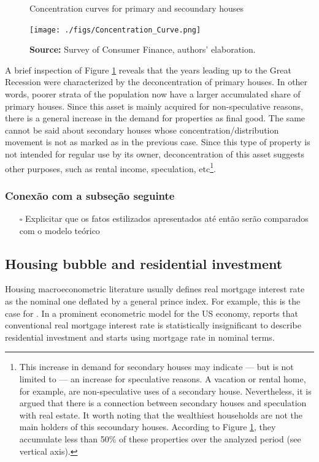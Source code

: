 \documentclass[11pt]{article}
\begin{document}
\begin{figure}[htb]
    \centering
        \caption{Concentration curves for primary and secoundary houses} 
    \texttt{[image: ./figs/Concentration\_Curve.png]}
    \label{fig:concentration}
    \caption*{\textbf{Source:} Survey of Consumer Finance, authors’ elaboration.}
\end{figure}


A brief inspection of Figure \ref{fig:concentration} reveals that the years leading up to the Great Recession were characterized by the deconcentration of primary houses. In other words, poorer strata of the population now have a larger accumulated share of primary houses. 
Since this asset is mainly acquired for non-speculative reasons, there is a general increase in the demand for properties as final good. The same cannot be said about secondary houses whose concentration/distribution movement is not as marked as in the previous case. Since this type of property is not intended for regular use by its owner, deconcentration of this asset suggests other purposes, such as rental income, speculation, etc\footnote{This increase in demand for secondary houses may indicate --- but is not limited to --- an increase for speculative reasons. A vacation or rental home, for example, are non-speculative uses of a secondary house. Nevertheless, it is argued that there is a connection between secondary houses and speculation with real estate. It worth noting that the wealthiest households are not the main holders of this secoundary houses. According to Figure \ref{fig:concentration}, they accumulate less than 50\% of these properties over the analyzed period (see vertical axis).}.

\subsubsection{Conexão com a subseção seguinte}
\label{sec:org71bd8fc}


\begin{itemize}
\item[{$\square$}] Explicitar que os fatos estilizados apresentados até então serão comparados com o modelo teórico
\end{itemize}

\subsection{Housing bubble and residential investment}
\label{sec:org448a682}

Housing macroeconometric literature usually defines real mortgage interest rate as the nominal one deflated by a general prince index.
For example, this is the case for \textcites{goodhart_house_2008}{arestis_economic_2019}{huang_is_2020}.
In a prominent econometric model for the US economy, \textcite{fair_macroeconometric_2013} reports that conventional real mortgage interest rate is statistically insignificant to describe residential investment and starts using mortgage rate in nominal terms.
\end{document}
